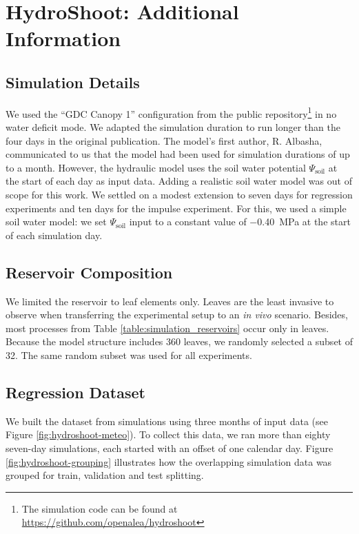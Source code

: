 \chapter{HydroShoot: Additional Information} \label{app:hydroshoot}

\section{Simulation Details} \label{app:hydroshoot-sim-details}

We used the ``GDC Canopy 1'' configuration from the public repository\footnote{The simulation code can be found at \url{https://github.com/openalea/hydroshoot}} in no water deficit mode.
We adapted the simulation duration to run longer than the four days in the original publication.
The model's first author, R. Albasha, communicated to us that the model had been used for simulation durations of up to a month.
However, the hydraulic model uses the soil water potential $\Psi_{\text{soil}}$ at the start of each day as input data.
Adding a realistic soil water model was out of scope for this work. We settled on a modest extension to seven days for regression experiments and ten days for the impulse experiment.
For this, we used a simple soil water model: we set $\Psi_{\text{soil}}$ input to a constant value of \SI{-0.40}{\mega\pascal} at the start of each simulation day.


\section{Reservoir Composition} \label{app:hydroshoot-reservoir}

We limited the reservoir to leaf elements only. 
Leaves are the least invasive to observe when transferring the experimental setup to an \textit{in vivo} scenario.
Besides, most processes from Table \ref{table:simulation_reservoirs} occur only in leaves.
Because the model structure includes 360 leaves, we randomly selected a subset of 32. 
The same random subset was used for all experiments.


\section{Regression Dataset} \label{app:hydroshoot-dataset}

We built the dataset from simulations using three months of input data (see Figure \ref{fig:hydroshoot-meteo}).
To collect this data, we ran more than eighty seven-day simulations, each started with an offset of one calendar day.
Figure \ref{fig:hydroshoot-grouping} illustrates how the overlapping simulation data was grouped for train, validation and test splitting.

